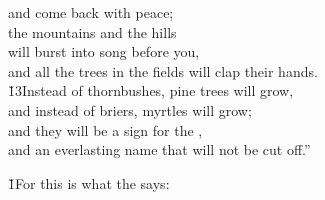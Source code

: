 \begin{poetry}
\poemll    and come back with peace; \\
\poeml the mountains and the hills \\
\poemll    will burst into song before you, \\
\poemlll       and all the trees in the fields will clap their hands. \\
\poeml \v{13}Instead of thornbushes, pine trees will grow, \\
\poemll    and instead of briers, myrtles will grow; \\
\poeml and they will be a sign for the , \\
\poemll    and an everlasting name that will not be cut off.''
\end{poetry}

\v{1}For this is what the  says:

